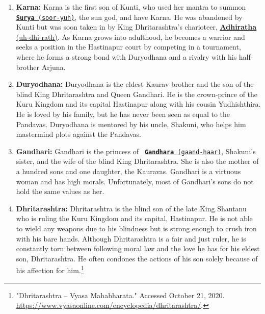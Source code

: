 \documentclass[10pt, letterpaper]{article}
\begin{document}
\begin{enumerate}
\item
  
  \textbf{Karna:} Karna is the first son of Kunti, who used her mantra
  to summon
  \texttt{\underline{\href{https://drive.google.com/file/d/1fEW3QjbmhBje9W737N1ulmb1f17kCwT-/view?usp=sharing}{\textbf{Surya}}
  (soor-yuh)}}, the sun god, and have Karna. He was abandoned by Kunti
  but was soon taken in by King Dhritarashtra's charioteer,
  \underline{\href{https://drive.google.com/file/d/13Chs3HPXTn_XgPFZ06OKbUmUajkvxqVE/view?usp=sharing}{\textbf{Adhiratha}}
  (uh-dhi-rath)}. As Karna grows into adulthood, he becomes a warrior
  and seeks a position in the Hastinapur court by competing in a
  tournament, where he forms a strong bond with Duryodhana and a rivalry
  with his half-brother Arjuna.
  
\item
  
  \textbf{Duryodhana:} Duryodhana is the eldest Kaurav brother and the
  son of the blind King Dhritarashtra and Queen Gandhari. He is the
  crown-prince of the Kuru Kingdom and its capital Hastinapur along with
  his cousin Yudhishthira. He is loved by his family, but he has never
  been seen as equal to the Pandavas. Duryodhana is mentored by his
  uncle, Shakuni, who helps him mastermind plots against the Pandavas.
  
\item
  
  \textbf{Gandhari:} Gandhari is the princess of
 \texttt{ \underline{\href{https://drive.google.com/file/d/1z52DVt7sLKxwvSc1rVTklxelP2s2C3qw/view?usp=sharing}{\textbf{Gandhara}}
  (gaand-haar)}}, Shakuni's sister, and the wife of the blind King
  Dhritarashtra. She is also the mother of a hundred sons and one
  daughter, the Kauravas. Gandhari is a virtuous woman and has high
  morals. Unfortunately, most of Gandhari's sons do not hold the same
  values as her.
  
\item
  
  \textbf{Dhritarashtra:} Dhritarashtra is the blind son of the late
  King Shantanu who is ruling the Kuru Kingdom and its capital,
  Hastinapur. He is not able to wield any weapons due to his blindness
  but is strong enough to crush iron with his bare hands. Although
  Dhritarashtra is a fair and just ruler, he is constantly torn between
  following moral law and the love he has for his eldest son,
  Dhritarashtra. He often condones the actions of his son solely because
  of his affection for him.\footnote{"Dhritarashtra -- Vyasa
    Mahabharata." Accessed October 21, 2020.
    \href{https://www.vyasaonline.com/encyclopedia/dhritarashtra/}{\underline{https://www.vyasaonline.com/encyclopedia/dhritarashtra/}}.}
  

\end{enumerate}
\end{document}
